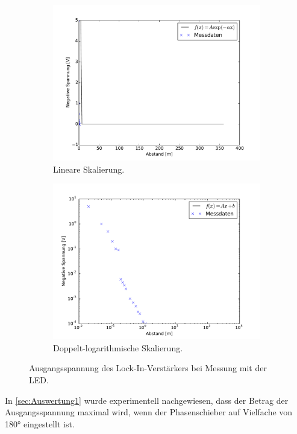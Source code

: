 \begin{figure}[hbp]
	\centering
	\begin{subfigure}{0.8\textwidth}
		\includegraphics[width=\textwidth]{Bilder/LED.pdf}
		\caption{Lineare Skalierung.}
	\end{subfigure}
	\begin{subfigure}{0.8\textwidth}
		\includegraphics[width=\textwidth]{Bilder/LED_log.pdf}
		\caption{Doppelt-logarithmische Skalierung.}
		\label{diag:LED_log}
	\end{subfigure}
	\caption{Ausgangsspannung des Lock-In-Verstärkers bei Messung mit der LED.}
	\label{diag:LED}
\end{figure}
In \ref{sec:Auswertung1} wurde experimentell nachgewiesen, dass der Betrag der Ausgangsspannung maximal wird, wenn der Phasenschieber auf Vielfache von 180° eingestellt ist.
